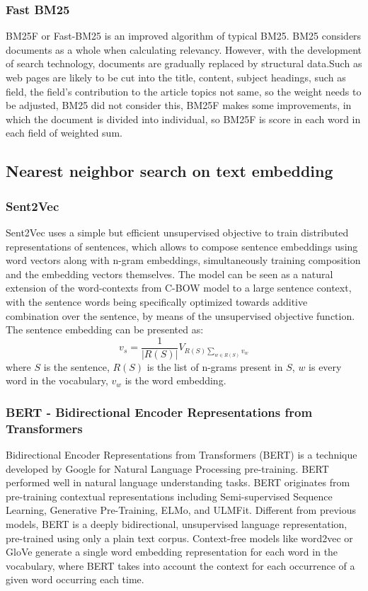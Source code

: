 \subsubsection{Fast BM25}

BM25F or Fast-BM25 is an improved algorithm of typical BM25. BM25 considers documents as a whole when calculating relevancy. However, with the development of search technology, documents are gradually replaced by structural data.Such as web pages are likely to be cut into the title, content, subject headings, such as field, the field's contribution to the article topics not same, so the weight needs to be adjusted, BM25 did not consider this, BM25F makes some improvements, in which the document is divided into individual, so BM25F is score in each word in each field of weighted sum.

\subsection{Nearest neighbor search on text embedding}

\subsubsection{Sent2Vec}

Sent2Vec \cite{Matteo_2018} uses a simple but efficient unsupervised objective to train distributed representations of sentences, which allows to compose sentence embeddings using word vectors along with n-gram embeddings, simultaneously training composition and the embedding vectors themselves.
The model can be seen as a natural extension of the word-contexts from C-BOW model to a large sentence context, with the sentence words being specifically optimized towards additive combination over the sentence, by means of the unsupervised objective function.\\

The sentence embedding can be presented as:
$$ v_s = \frac{1}{|R(S)|} V_{R(S)\sum_{w\in R(S)}v_w} $$
where $S$ is the sentence, $R(S)$ is the list of n-grams present in $S$, $w$ is every word in the vocabulary, $v_w$ is the word embedding.


\subsubsection{BERT - Bidirectional Encoder Representations from Transformers}

Bidirectional Encoder Representations from Transformers (BERT) \cite{wikipedia_bert} is a technique developed by Google for Natural Language Processing pre-training. BERT performed well in natural language understanding tasks. BERT originates from pre-training contextual representations including Semi-supervised Sequence Learning, Generative Pre-Training, ELMo, and ULMFit. Different from previous models, BERT is a deeply bidirectional, unsupervised language representation, pre-trained using only a plain text corpus. Context-free models like word2vec or GloVe generate a single word embedding representation for each word in the vocabulary, where BERT takes into account the context for each occurrence of a given word occurring each time.

